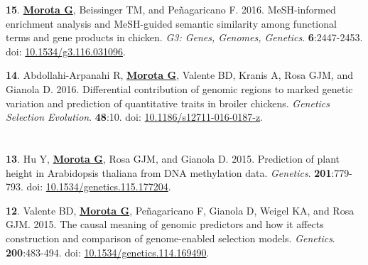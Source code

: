 \documentclass[margin,line,10pt]{res}
\newenvironment{list1}{
  \begin{list}{\ding{113}}{%
      \setlength{\itemsep}{0in}
      \setlength{\parsep}{0in} \setlength{\parskip}{0in}
      \setlength{\topsep}{0in} \setlength{\partopsep}{0in} 
      \setlength{\leftmargin}{0.17in}}}{\end{list}}
\begin{document}
\begin{resume}
\begin{list1}

  \item [{\bf 15}.]  \textbf{\underline{Morota G}}, Beissinger TM, and Pe\~{n}agaricano F. 2016. MeSH-informed enrichment analysis and MeSH-guided semantic similarity among functional terms and gene products in chicken. \emph{G3: Genes, Genomes, Genetics}. \textbf{6}:2447-2453. doi: \textcolor{blue}{\href{http://dx.doi.org/10.1534/g3.116.031096}{10.1534/g3.116.031096}}.  

\vspace{0.5cm}

  \item [{\bf 14}.] Abdollahi-Arpanahi R, {\bf \underline{Morota G}}, Valente BD, Kranis A, Rosa GJM, and Gianola D. 
  2016. Differential contribution of genomic regions to marked genetic variation and prediction of quantitative traits in broiler chickens. \emph{Genetics Selection Evolution}. \textbf{48}:10. doi: \textcolor{blue}{\href{http://dx.doi.org/10.1186/s12711-016-0187-z}{10.1186/s12711-016-0187-z}}.  

\end{list1}
  
\section{}

\begin{list1}

\item [{\bf 13}.]  Hu Y, {\bf \underline{Morota G}}, Rosa GJM, and Gianola D. 2015. Prediction of plant height in Arabidopsis thaliana from DNA methylation data. \emph{Genetics}. \textbf{201}:779-793. doi: \textcolor{blue}{\href{http://dx.doi.org/10.1534/genetics.115.177204}{10.1534/genetics.115.177204}}.  

\vspace{0.5cm}

\item [{\bf 12}.]  Valente BD, {\bf \underline{Morota G}}, Pe\~{n}agaricano F, Gianola D, Weigel KA, and Rosa GJM. 2015. The causal meaning of genomic predictors and how it affects  construction and comparison of genome-enabled selection models. \emph{Genetics}. \textbf{200}:483-494. doi: \textcolor{blue}{\href{http://dx.doi.org/10.1534/genetics.114.169490}{10.1534/genetics.114.169490}}.  

\vspace{0.5cm}


\end{list1}
\end{resume}
\end{document}
